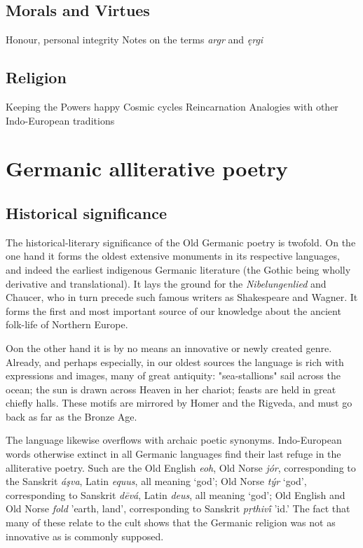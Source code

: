   \subsection{Morals and Virtues}
    Honour, personal integrity
    Notes on the terms \emph{argr} and \emph{ęrgi}
  \subsection{Religion}
    Keeping the Powers happy
    Cosmic cycles
    Reincarnation
    Analogies with other Indo-European traditions


\section{Germanic alliterative poetry}

  \subsection{Historical significance}

  The historical-literary significance of the Old Germanic poetry is twofold. On the one hand it forms the oldest extensive monuments in its respective languages, and indeed the earliest indigenous Germanic literature (the Gothic being wholly derivative and translational).  It lays the ground for the \emph{Nibelungenlied} and Chaucer, who in turn precede such famous writers as Shakespeare and Wagner.  It forms the first and most important source of our knowledge about the ancient folk-life of Northern Europe.

  Oon the other hand it is by no means an innovative or newly created genre. Already, and perhaps especially, in our oldest sources the language is rich with expressions and images, many of great antiquity: "sea-stallions" sail across the ocean; the sun is drawn across Heaven in her chariot; feasts are held in great chiefly halls. These motifs are mirrored by Homer and the Rigveda, and must go back as far as the Bronze Age.

  The language likewise overflows with archaic poetic synonyms.  Indo-European words otherwise extinct in all Germanic languages find their last refuge in the alliterative poetry.  Such are the Old English \emph{eoh}, Old Norse \emph{jór}, corresponding to the Sanskrit \emph{áşva}, Latin \emph{equus}, all meaning ‘god’; Old Norse \emph{týr} ‘god’, corresponding to Sanskrit \emph{dēvá}, Latin \emph{deus}, all meaning ‘god’; Old English and Old Norse \emph{fold} 'earth, land', corresponding to Sanskrit \emph{pṛthivī́} 'id.'  The fact that many of these relate to the cult shows that the Germanic religion was not as innovative as is commonly supposed.

